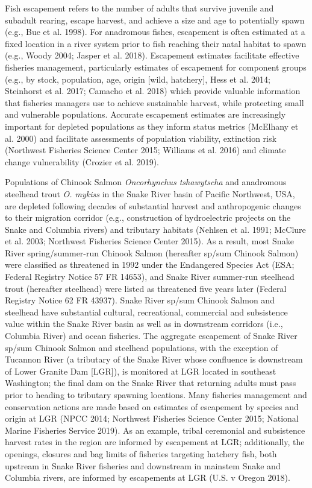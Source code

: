 \documentclass[
  12pt,
]{article}
\begin{document}
Fish escapement refers to the number of adults that survive juvenile and subadult rearing, escape harvest, and achieve a size and age to potentially spawn (e.g., Bue et al. 1998). For anadromous fishes, escapement is often estimated at a fixed location in a river system prior to fish reaching their natal habitat to spawn (e.g., Woody 2004; Jasper et al. 2018). Escapement estimates facilitate effective fisheries management, particularly estimates of escapement for component groups (e.g., by stock, population, age, origin {[}wild, hatchery{]}, Hess et al. 2014; Steinhorst et al. 2017; Camacho et al. 2018) which provide valuable information that fisheries managers use to achieve sustainable harvest, while protecting small and vulnerable populations. Accurate escapement estimates are increasingly important for depleted populations as they inform status metrics (McElhany et al. 2000) and facilitate assessments of population viability, extinction risk (Northwest Fisheries Science Center 2015; Williams et al. 2016) and climate change vulnerability (Crozier et al. 2019).

Populations of Chinook Salmon \emph{Oncorhynchus tshawytscha} and anadromous steelhead trout \emph{O. mykiss} in the Snake River basin of Pacific Northwest, USA, are depleted following decades of substantial harvest and anthropogenic changes to their migration corridor (e.g., construction of hydroelectric projects on the Snake and Columbia rivers) and tributary habitats (Nehlsen et al. 1991; McClure et al. 2003; Northwest Fisheries Science Center 2015). As a result, most Snake River spring/summer-run Chinook Salmon (hereafter sp/sum Chinook Salmon) were classified as threatened in 1992 under the Endangered Species Act (ESA; Federal Registry Notice 57 FR 14653), and Snake River summer-run steelhead trout (hereafter steelhead) were listed as threatened five years later (Federal Registry Notice 62 FR 43937). Snake River sp/sum Chinook Salmon and steelhead have substantial cultural, recreational, commercial and subsistence value within the Snake River basin as well as in downstream corridors (i.e., Columbia River) and ocean fisheries. The aggregate escapement of Snake River sp/sum Chinook Salmon and steelhead populations, with the exception of Tucannon River (a tributary of the Snake River whose confluence is downstream of Lower Granite Dam {[}LGR{]}), is monitored at LGR located in southeast Washington; the final dam on the Snake River that returning adults must pass prior to heading to tributary spawning locations. Many fisheries management and conservation actions are made based on estimates of escapement by species and origin at LGR (NPCC 2014; Northwest Fisheries Science Center 2015; National Marine Fisheries Service 2019). As an example, tribal ceremonial and subsistence harvest rates in the region are informed by escapement at LGR; additionally, the openings, closures and bag limits of fisheries targeting hatchery fish, both upstream in Snake River fisheries and downstream in mainstem Snake and Columbia rivers, are informed by escapements at LGR (U.S. v Oregon 2018).
\end{document}

